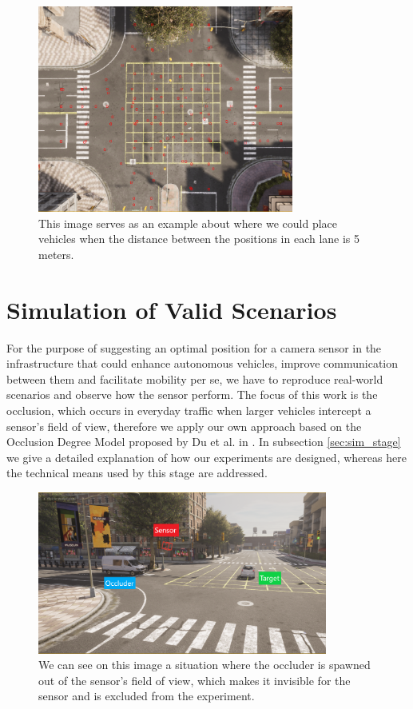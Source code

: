 \begin{figure} [h!]
    \centering
    \includegraphics[width=0.75\textwidth]{images/waypoints_target.png}
    \caption[Vehicle waypoints with specified distance]{This image serves as an example about where we could place vehicles when the distance between the positions in each lane is 5 meters.}
    \label{fig:distance_waypoints}
\end{figure}

\section{Simulation of Valid Scenarios}
For the purpose of suggesting an optimal position for a camera sensor in the infrastructure that could enhance autonomous vehicles, improve communication between them and facilitate mobility per se, we have to reproduce real-world scenarios and observe how the sensor perform. The focus of this work is the occlusion, which occurs in everyday traffic when larger vehicles intercept a sensor's field of view, therefore we apply our own approach based on the Occlusion Degree Model proposed by Du et al. in \cite{occlusion_degree_model}. In subsection \ref{sec:sim_stage} we give a detailed explanation of how our experiments are designed, whereas here the technical means used by this stage are addressed.

\begin{figure} [h!]
    \centering
    \includegraphics[width=0.85\textwidth]{images/behind_sensor.png}
    \caption[Vehicle spawned behind the camera]{We can see on this image a situation where the occluder is spawned out of the sensor's field of view, which makes it invisible for the sensor and is excluded from the experiment.}
    \label{fig:behind_sensor}
\end{figure}

